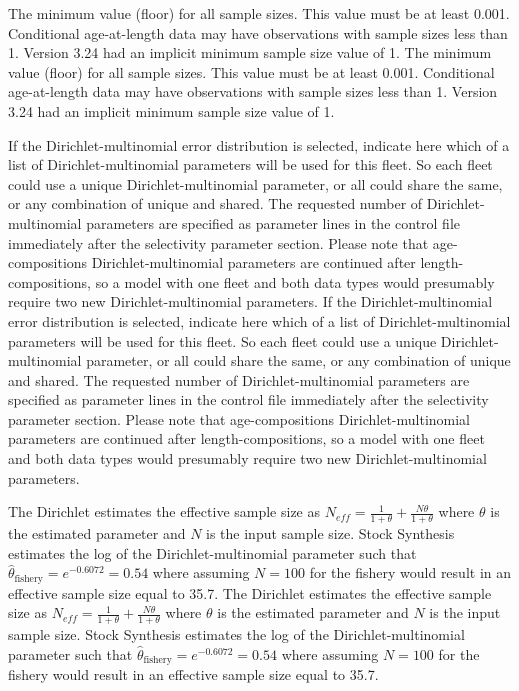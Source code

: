 The minimum value (floor) for all sample sizes. This value must be at least 0.001. Conditional age-at-length data may have observations with sample sizes less than 1. Version 3.24 had an implicit minimum sample size value of 1.
The minimum value (floor) for all sample sizes. This value must be at least 0.001. Conditional age-at-length data may have observations with sample sizes less than 1. Version 3.24 had an implicit minimum sample size value of 1.

If the Dirichlet-multinomial error distribution is selected, indicate here which of a list of Dirichlet-multinomial parameters will be used for this fleet. So each fleet could use a unique Dirichlet-multinomial parameter, or all could share the same, or any combination of unique and shared. The requested number of Dirichlet-multinomial parameters are specified as parameter lines in the control file immediately after the selectivity parameter section. Please note that age-compositions Dirichlet-multinomial parameters are continued after length-compositions, so a model with one fleet and both data types would presumably require two new Dirichlet-multinomial parameters.  	
If the Dirichlet-multinomial error distribution is selected, indicate here which of a list of Dirichlet-multinomial parameters will be used for this fleet. So each fleet could use a unique Dirichlet-multinomial parameter, or all could share the same, or any combination of unique and shared. The requested number of Dirichlet-multinomial parameters are specified as parameter lines in the control file immediately after the selectivity parameter section. Please note that age-compositions Dirichlet-multinomial parameters are continued after length-compositions, so a model with one fleet and both data types would presumably require two new Dirichlet-multinomial parameters.  	
	
The Dirichlet estimates the effective sample size as $N_{eff}=\frac{1}{1+\theta}+\frac{N\theta}{1+\theta}$ where $\theta$ is the estimated parameter and $N$ is the input sample size. Stock Synthesis estimates the log of the Dirichlet-multinomial parameter such that $\hat{\theta}_{\text{fishery}} = e^{-0.6072} = 0.54$ where assuming $N=100$ for the fishery would result in an effective sample size equal to 35.7.
The Dirichlet estimates the effective sample size as $N_{eff}=\frac{1}{1+\theta}+\frac{N\theta}{1+\theta}$ where $\theta$ is the estimated parameter and $N$ is the input sample size. Stock Synthesis estimates the log of the Dirichlet-multinomial parameter such that $\hat{\theta}_{\text{fishery}} = e^{-0.6072} = 0.54$ where assuming $N=100$ for the fishery would result in an effective sample size equal to 35.7.
	
